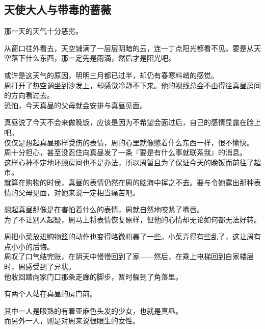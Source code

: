 \subsection{天使大人与带毒的蔷薇}

那一天的天气十分恶劣。

从窗口往外看去，天空铺满了一层层阴暗的云，连一丁点阳光都看不见。要是从天空落下什么东西，那一定先是雨滴，然后才是阳光吧。

或许是这天气的原因，明明三月都已过半，却仍有春寒料峭的感觉。\\

周打开了热空调坐到沙发上，却感觉冷静不下来。他的视线总会不由得往真昼房间的方向看过去。\\

恐怕，今天真昼的父母就会安排与真昼见面。

真昼说了今天不会来做晚饭，应该是因为不希望会面过后，自己的感情显露在脸上吧。\\

仅仅是想起真昼那样受伤的表情，周的心里就像憋着什么东西一样，很不愉快。\\

周十分担心，甚至没忍住向真昼发了一条『要是有什么事就联系我』的消息。\\

这样心神不定地环顾房间也不是办法，所以周暂且为了保证今天的晚饭而前往了超市。\\

就算在购物的时侯，真昼的表情仍然在周的脑海中挥之不去。要与令她露出那种表情的父母见面，对她来说一定相当痛苦吧。

想起真昼那像是在害怕着什么的表情，周就自然地咬紧了嘴唇。\\

为了不让别人起疑，周马上将表情恢复原样，但他的心情却无论如何都无法好转。

周把小菜放进购物篮的动作也变得略微粗暴了一些。小菜弄得有些乱了，这让周有点小小的后悔。\\

周叹了口气结完账，在阴天中慢慢回到了家——然后，在乘上电梯回到自家楼层时，周感受到了异状。\\

他收回踏向家门口那条走廊的脚步，暂时躲到了角落里。

有两个人站在真昼的房门前。

其中一人是眼熟的有着亚麻色头发的少女，也就是真昼。\\

而另外一人，则是对周来说很眼生的女性。


